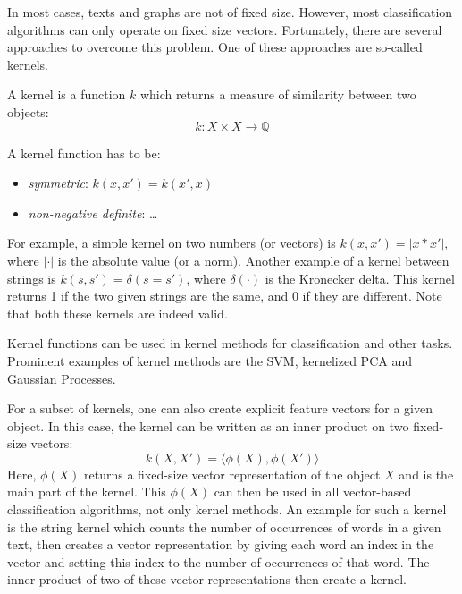 
In most cases, texts and graphs are not of fixed size.
However, most classification algorithms can only operate on fixed size vectors.
Fortunately, there are several approaches to overcome this problem.
One of these approaches are so-called kernels.

A kernel is a function $k$ which returns a measure of similarity between two objects:
\begin{equation*}
k: X \times X \rightarrow \mathbb{Q}
\end{equation*}

A kernel function has to be:
\begin{itemize}
    \item{\textit{symmetric}: $k(x, x') = k(x', x)$}
    \item{\textit{non-negative definite}: \dots}
\end{itemize}

For example, a simple kernel on two numbers (or vectors) is $k(x, x') = | x * x' |$, where $| \cdot |$ is the absolute value (or a norm).
Another example of a kernel between strings is $k(s, s') = \delta(s = s')$, where $\delta(\cdot)$ is the Kronecker delta. This kernel returns 1 if the two given strings are the same, and 0 if they are different.
Note that both these kernels are indeed valid.

Kernel functions can be used in kernel methods for classification and other tasks.
Prominent examples of kernel methods are the SVM, kernelized PCA and Gaussian Processes.

For a subset of kernels, one can also create explicit feature vectors for a given object. In this case, the kernel can be written as an inner product on two fixed-size vectors:
\begin{equation*}
    k(X, X') = \langle \phi(X), \phi(X') \rangle
\end{equation*}
Here, $\phi(X)$ returns a fixed-size vector representation of the object $X$ and is the main part of the kernel.
This $\phi(X)$ can then be used in all vector-based classification algorithms, not only kernel methods.
An example for such a kernel is the string kernel which counts the number of occurrences of words in a given text, then creates a vector representation by giving each word an index in the vector and setting this index to the number of occurrences of that word. The inner product of two of these vector representations then create a kernel.

